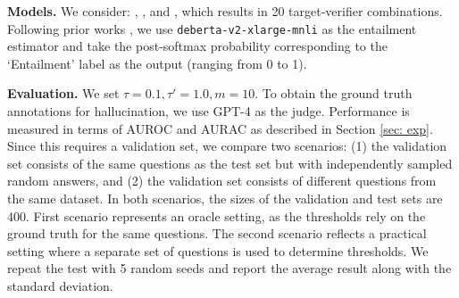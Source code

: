 \textbf{Models.} We consider: \llamathreeseventy{}, \llamatwoseventy{} \llamatwothirteen{}, \mixtral{} and \merlinite{}, which results in 20 target-verifier combinations. Following prior works \cite{lin2023generating,kuhn2023semantic,nikitin2024kernel}, we use \texttt{deberta-v2-xlarge-mnli} as the entailment estimator and take the post-softmax probability corresponding to the `Entailment' label as the output (ranging from 0 to 1). 

\textbf{Evaluation.} We set $\tau=0.1, \tau'=1.0, m=10$.  To obtain the ground truth annotations for hallucination, we use GPT-4 as the judge. Performance is measured in terms of AUROC and AURAC as described in Section \ref{sec: exp}. Since this requires a validation set, we compare two scenarios: (1) the validation set consists of the same questions as the test set but with independently sampled random answers, and (2) the validation set consists of different questions from the same dataset. In both scenarios, the sizes of the validation and test sets are 400. First scenario represents an oracle setting, as the thresholds rely on the ground truth for the same questions. The second scenario reflects a practical setting where a separate set of questions is used to determine thresholds. We repeat the test with 5 random seeds and report the average result along with the standard deviation. 




